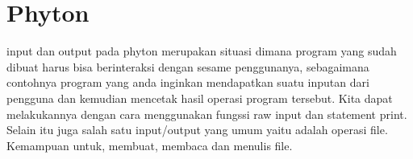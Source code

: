 

\section{Phyton}

input dan output pada phyton merupakan
situasi dimana program yang sudah dibuat harus bisa berinteraksi dengan sesame penggunanya,
sebagaimana contohnya program yang anda inginkan mendapatkan suatu inputan dari
pengguna dan kemudian mencetak hasil operasi program tersebut. Kita dapat
melakukannya dengan cara menggunakan fungssi raw input dan statement print. Selain
itu juga salah satu input/output yang umum yaitu adalah operasi file. Kemampuan
untuk, membuat, membaca dan menulis file.

